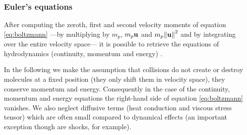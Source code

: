 \subsubsection{Euler's equations}
After computing the zeroth, first and second velocity moments of equation \eqref{eq:boltzmann} ---by multiplying by $m_p$, $m_p\boldsymbol{\mathbf{u}}$ and $m_p\norm{\boldsymbol{\mathbf{u}}}^2$ and by integrating over the entire velocity space--- it is possible to retrieve the equations of hydrodynamics (continuity, momentum and energy) \citep[][and \cite{Vandenbroucke2016} for an extended derivation]{Huang1987}.

In the following we make the assumption that collisions do not create or destroy molecules at a fixed position (they only shift them in velocity space), they conserve momentum and energy.
Consequently in the case of the continuity, momentum and energy equations the right-hand side of equation \eqref{eq:boltzmann} vanishes.
We also neglect diffusive terms (heat conduction and viscous stress tensor) which are often small compared to dynamical effects (an important exception though are shocks, for example).

